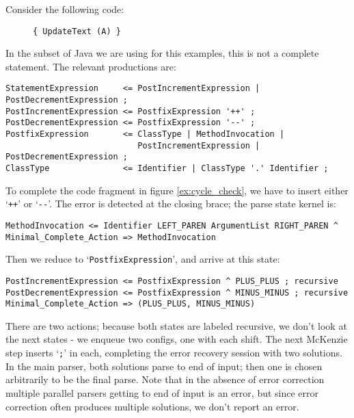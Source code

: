 \documentclass{article}
\newcommand{\code}[1]{`\lstinline|#1|'}
\begin{document}
Consider the following code:
\begin{figure}[H]
\begin{lstlisting}
{ UpdateText (A) }
\end{lstlisting}
\caption{}
\label{ex:minimal_complete_all_recursive}
\end{figure}
In the subset of Java we are using for this examples, this is not a
complete statement. The relevant productions are:
\begin{verbatim}
StatementExpression     <= PostIncrementExpression | PostDecrementExpression ;
PostIncrementExpression <= PostfixExpression '++' ;
PostDecrementExpression <= PostfixExpression '--' ;
PostfixExpression       <= ClassType | MethodInvocation |
                           PostIncrementExpression | PostDecrementExpression ;
ClassType               <= Identifier | ClassType '.' Identifier ;
\end{verbatim}
To complete the code fragment in figure \ref{ex:cycle_check}, we have
to insert either \code{++} or \code{--}. The error is detected at the
closing brace; the parse state kernel is:
\begin{verbatim}
MethodInvocation <= Identifier LEFT_PAREN ArgumentList RIGHT_PAREN ^
Minimal_Complete_Action => MethodInvocation
\end{verbatim}
Then we reduce to \code{PostfixExpression}, and arrive at this state:
\begin{verbatim}
PostIncrementExpression <= PostfixExpression ^ PLUS_PLUS ; recursive
PostDecrementExpression <= PostfixExpression ^ MINUS_MINUS ; recursive
Minimal_Complete_Action => (PLUS_PLUS, MINUS_MINUS)
\end{verbatim}
There are two actions; because both states are labeled recursive, we
don't look at the next states - we enqueue two configs, one with each
shift. The next McKenzie step inserts \code{;} in each, completing the
error recovery session with two solutions. In the main parser, both
solutions parse to end of input; then one is chosen arbitrarily to be
the final parse. Note that in the absence of error correction multiple
parallel parsers getting to end of input is an error, but since error
correction often produces multiple solutions, we don't report an
error.
\end{document}

